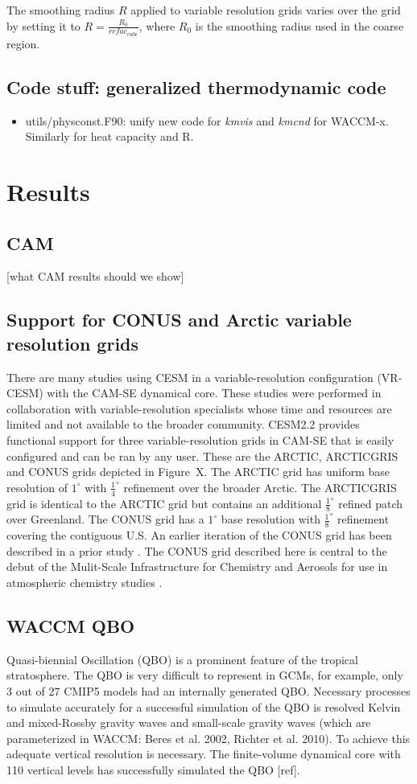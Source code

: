 \documentclass[draft]{agujournal2019}
\begin{document}
The smoothing radius $R$ applied to variable resolution grids varies over the grid by setting it to $R=\frac{R_{0}}{rrfac_{cube}}$, where $R_0$ is the smoothing radius used in the coarse region.

\subsection{Code stuff: generalized thermodynamic code}
\begin{itemize}
\item utils/physconst.F90: unify new code for {\em{kmvis}} and {\em{kmcnd}} for WACCM-x. Similarly for heat capacity and R.
\end{itemize}
\section{Results}
\subsection{CAM}
[what CAM results should we show]
\subsection{Support for CONUS and Arctic variable resolution grids}
There are many studies using CESM in a variable-resolution configuration (VR-CESM) with the CAM-SE dynamical core. These studies were performed in collaboration with variable-resolution specialists whose time and resources are limited and not available to the broader community. CESM2.2 provides functional support for three variable-resolution grids in CAM-SE that is easily configured and can be ran by any user. These are the ARCTIC, ARCTICGRIS and CONUS grids depicted in Figure~X. The ARCTIC grid has uniform base resolution of $1^{\circ}$ with $\frac{1}{4}^{\circ}$ refinement over the broader Arctic. The ARCTICGRIS grid is identical to the ARCTIC grid but contains an additional $\frac{1}{8}^{\circ}$ refined patch over Greenland. The CONUS grid has a $1^{\circ}$ base resolution with $\frac{1}{8}^{\circ}$ refinement covering the contiguous U.S. An earlier iteration of the CONUS grid has been described in a prior study \cite{GetAl2017JAMES}. The CONUS grid described here is central to the debut of the Mulit-Scale Infrastructure for Chemistry and Aerosols for use in atmospheric chemistry studies \cite{MUSICA2020}.

\subsection{WACCM QBO}
Quasi-biennial Oscillation (QBO) is a prominent feature of the tropical stratosphere. The QBO is very difficult to represent in GCMs, for example, only 3 out of 27 CMIP5 models had an internally generated QBO. Necessary processes to simulate accurately for a successful simulation of the QBO is resolved Kelvin and mixed-Rossby gravity waves and small-scale gravity waves (which are parameterized in WACCM: Beres et al. 2002, Richter et al. 2010). To achieve this adequate vertical resolution is necessary. The finite-volume dynamical core with 110 vertical levels has successfully simulated the QBO [ref].
\end{document}
